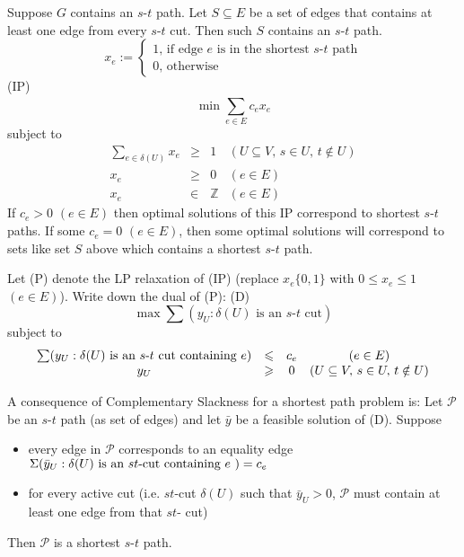 Suppose $ G $ contains an $s$-$t$ path. Let $ S\subseteq E $ be a set of edges that contains
at least one edge from every $s$-$t$ cut. Then such $ S $ contains an $s$-$t$ path.
\[ x_e:=
    \begin{cases}
        1,\,\text{if edge $e$ is in the shortest $s$-$t$ path} \\
        0,\,\text{otherwise}
    \end{cases} \]
(IP) \[ \min \sum\limits_{e\in E}^{} c_e x_e \]
subject to
\[
    \begin{array}{cccc}
        \sum\limits_{e\in\delta(U)} x_e & \geqslant & 1          & (U\subseteq V,\,s\in U,\,t\notin U) \\
        x_e                             & \geqslant & 0          & (e\in E)                            \\
        x_e                             & \in       & \mathbb{Z} & (e\in E)
    \end{array}
\]
If $ c_e>0$ $(e\in E)$ then optimal solutions of this IP correspond to
shortest $s$-$t$ paths. If some $ c_e=0 $ $(e\in E)$, then some optimal solutions will
correspond to sets like set $ S $ above which contains a shortest $s$-$t$ path.

Let (P) denote the LP relaxation of (IP) (replace $ x_e \{0,1\} $ with
$ 0\leqslant x_e\leqslant 1$ $ (e\in E) $). Write down the dual of (P):
(D)
\[ \max \sum(y_U:\delta(U)\text{ is an $s$-$t$ cut})  \]
subject to
\[
    \begin{array}{cccc}
        \sum(y_U:\delta(U)\text{ is an $s$-$t$ cut containing $ e $}) & \leqslant & c_e & (e\in E)                            \\
        y_U                                                           & \geqslant & 0   & (U\subseteq V,\,s\in U,\,t\notin U)
    \end{array} \]

A consequence of Complementary Slackness for a shortest path problem is:
Let $ \mathcal{P} $ be an $s$-$t$ path (as set of edges) and let
$ \bar{y} $ be a feasible solution of (D). Suppose
\begin{itemize}
    \item every edge in $ \mathcal{P} $ corresponds to an equality edge
          $ \Sigma(\bar{y}_U:\delta(U)\text{ is an $st$-cut containing $ e $ })=c_e $
    \item for every active cut (i.e. $st$-cut $ \delta(U) $ such that
          $ \bar{y}_U>0 $, $ \mathcal{P} $ must contain at least one edge from
          that $ st $- cut)
\end{itemize}
Then $ \mathcal{P} $ is a shortest $s$-$t$ path.

